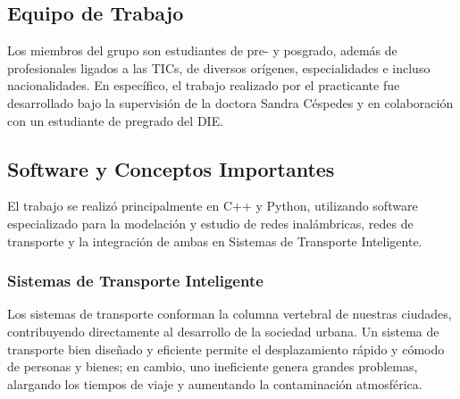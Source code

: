 \documentclass[11pt,letterpaper]{article}
\begin{document}
\subsection{Equipo de Trabajo}

Los miembros del grupo son estudiantes de pre- y posgrado, además de profesionales ligados a las TICs, de diversos orígenes, especialidades e incluso nacionalidades. En específico, el trabajo realizado por el practicante fue desarrollado bajo la supervisión de la doctora Sandra Céspedes y en colaboración con un estudiante de pregrado del DIE.

\newpage
\subsection{Software y Conceptos Importantes}

El trabajo se realizó principalmente en C++ y Python, utilizando software especializado para la modelación y estudio de redes inalámbricas, redes de transporte y la integración de ambas en Sistemas de Transporte Inteligente.

\subsubsection{Sistemas de Transporte Inteligente}

Los sistemas de transporte conforman la columna vertebral de nuestras ciudades, contribuyendo directamente al desarrollo de la sociedad urbana. Un sistema de transporte bien diseñado y eficiente permite el desplazamiento rápido y cómodo de personas y bienes; en cambio, uno ineficiente genera grandes problemas, alargando los tiempos de viaje y aumentando la contaminación atmosférica.
\end{document}
